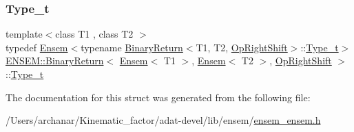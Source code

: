 \subsubsection{\texorpdfstring{Type\_t}{Type\_t}\hspace{0.1cm}{\footnotesize\ttfamily [3/3]}}
{\footnotesize\ttfamily template$<$class T1 , class T2 $>$ \\
typedef \mbox{\hyperlink{classENSEM_1_1Ensem}{Ensem}}$<$typename \mbox{\hyperlink{structENSEM_1_1BinaryReturn}{Binary\+Return}}$<$T1, T2, \mbox{\hyperlink{structENSEM_1_1OpRightShift}{Op\+Right\+Shift}}$>$\+::\mbox{\hyperlink{structENSEM_1_1BinaryReturn_3_01Ensem_3_01T1_01_4_00_01Ensem_3_01T2_01_4_00_01OpRightShift_01_4_a5f572b84bf6bd1cdf73ee915255349dc}{Type\+\_\+t}}$>$ \mbox{\hyperlink{structENSEM_1_1BinaryReturn}{E\+N\+S\+E\+M\+::\+Binary\+Return}}$<$ \mbox{\hyperlink{classENSEM_1_1Ensem}{Ensem}}$<$ T1 $>$, \mbox{\hyperlink{classENSEM_1_1Ensem}{Ensem}}$<$ T2 $>$, \mbox{\hyperlink{structENSEM_1_1OpRightShift}{Op\+Right\+Shift}} $>$\+::\mbox{\hyperlink{structENSEM_1_1BinaryReturn_3_01Ensem_3_01T1_01_4_00_01Ensem_3_01T2_01_4_00_01OpRightShift_01_4_a5f572b84bf6bd1cdf73ee915255349dc}{Type\+\_\+t}}}



The documentation for this struct was generated from the following file\+:\begin{DoxyCompactItemize}
\item 
/\+Users/archanar/\+Kinematic\+\_\+factor/adat-\/devel/lib/ensem/\mbox{\hyperlink{adat-devel_2lib_2ensem_2ensem__ensem_8h}{ensem\+\_\+ensem.\+h}}\end{DoxyCompactItemize}
